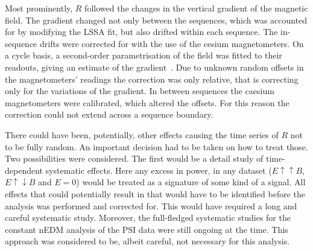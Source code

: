 Most prominently, $R$ followed the changes in the vertical gradient of the magnetic field. The gradient changed not only between the sequences, which was accounted for by modifying the LSSA fit, but also drifted within each sequence.
The in-sequence drifts were corrected for with the use of the cesium magnetometers. On a cycle basis, a second-order parametrisation of the field was fitted to their readouts, giving an estimate of the gradient~\cite{Afach2014magmoment,WurstenThesis}. Due to unknown random offsets in the magnetometers' readings the correction was only relative, that is correcting only for the variations of the gradient. In between sequences the caesium magnetometers were calibrated, which altered the offsets. For this reason the correction could not extend across a sequence boundary.

There could have been, potentially, other effects causing the time series of $R$ not to be fully random. An important decision had to be taken on how to treat those. Two possibilities were considered. The first would be a detail study of time-dependent systematic effects.
Here any excess in power, in any dataset ($E \uparrow \uparrow B$, $E \uparrow \downarrow B$ and $E=0$) would be treated as a signature of some kind of a signal. All effects that could potentially result in that would have to be identified before the analysis was performed and corrected for. This would have required a long and careful systematic study. Moreover, the full-fledged systematic studies for the constant nEDM analysis of the PSI data were still ongoing at the time. This approach was considered to be, albeit careful, not necessary for this analysis.


